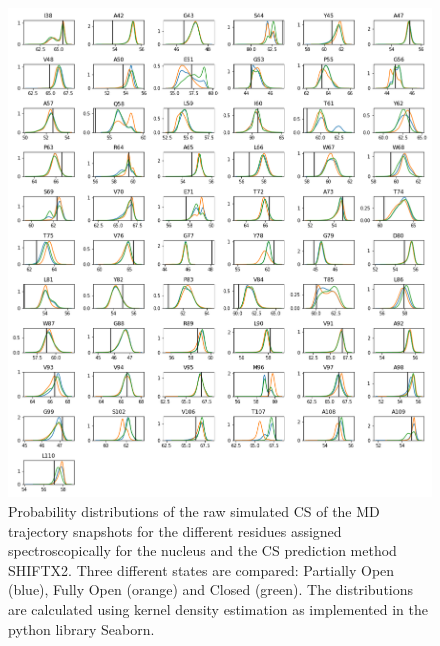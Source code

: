 \documentclass[%
 aip,
 amsmath,amssymb,
 preprint,%
]{revtex4-1}
\newcommand{\ca}{\ce{C_\alpha} }
\begin{document}
\begin{figure}[tbp]
	\includegraphics[width=\textwidth]{figures_SI/hist_sparta_plus_CA.png}
	 \caption{\scriptsize
 Probability distributions of the raw simulated CS of the MD trajectory snapshots for the different residues assigned spectroscopically for the \ca nucleus and the CS prediction method SHIFTX2. Three different states are compared: Partially Open (blue), Fully Open (orange) and Closed (green). The distributions are calculated using kernel density estimation as implemented in the python library Seaborn. 
}
\label{SI_hist5}
\end{figure}
\end{document}
